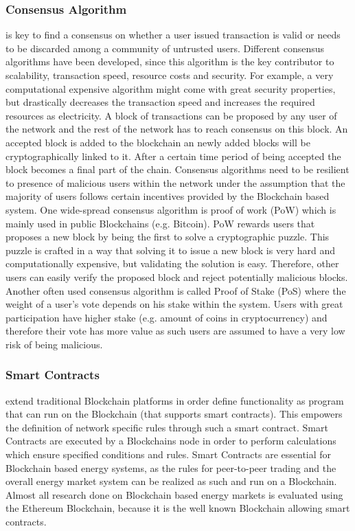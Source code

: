 \documentclass[runningheads]{llncs}
\begin{document}
\subsubsection{Consensus Algorithm} is key to find a consensus on whether a user issued transaction is valid or needs to be discarded among a community of untrusted users. Different consensus algorithms have been developed, since this algorithm is the key contributor to scalability, transaction speed, resource costs and security. For example, a very computational expensive algorithm might come with great security properties, but drastically decreases the transaction speed and increases the required resources as electricity. \newline
A block of transactions can be proposed by any user of the network and the rest of the network has to reach consensus on this block. An accepted block is added to the blockchain an newly added blocks will be cryptographically linked to it. After a certain time period of being accepted the block becomes a final part of the chain. Consensus algorithms need to be resilient to presence of malicious users within the network under the assumption that the majority of users follows certain incentives provided by the Blockchain based system. \newline
One wide-spread consensus algorithm is proof of work (PoW) which is mainly used in public Blockchains (e.g. Bitcoin). PoW rewards users that proposes a new block by being the first to solve a cryptographic puzzle. This puzzle is crafted in a way that solving it to issue a new block is very hard and computationally expensive, but validating the solution is easy. Therefore, other users can easily verify the proposed block and reject potentially malicious blocks.
Another often used consensus algorithm is called Proof of Stake (PoS) where the weight of a user's vote depends on his stake within the system. Users with great participation have higher stake (e.g. amount of coins in cryptocurrency) and therefore their vote has more value as such users are assumed to have a very low risk of being malicious. \cite{blockchain} \cite{andoni_energy_bc_review}

\subsubsection{Smart Contracts} extend traditional Blockchain platforms in order define functionality as program that can run on the Blockchain (that supports smart contracts). This empowers the definition of network specific rules through such a smart contract. Smart Contracts are executed by a Blockchains node in order to perform calculations which ensure specified conditions and rules. \cite{blockchain}
Smart Contracts are essential for Blockchain based energy systems, as the rules for peer-to-peer trading and the overall energy market system can be realized as such and run on a Blockchain. Almost all research done on Blockchain based energy markets is evaluated using the Ethereum Blockchain, because it is the well known Blockchain allowing smart contracts.
\end{document}
